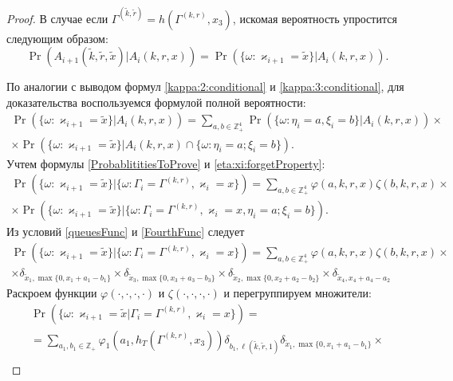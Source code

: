 \documentclass{report}
\begin{document}
\begin{proof}
В случае если $\Gamma^{(\tilde{k},\tilde{r})}=h(\Gamma^{(k,r)},x_3)$, искомая вероятность упростится следующим образом:
\begin{equation*}
\Pr (A_{i+1}(\tilde{k},\tilde{r},\tilde{x})| A_{i}({k},{r},{x})) 
=\Pr (\{\omega\colon \varkappa_{i+1}=\tilde{x}\}|A_{i}({k},{r},{x})).
\end{equation*}

По аналогии с выводом формул \eqref{kappa:2:conditional} и \eqref{kappa:3:conditional}, для доказательства воспользуемся формулой полной вероятности:
\begin{multline*}
\Pr (\{\omega\colon\varkappa_{i+1}=\tilde{x}\}|A_i(k,r,x) )= \sum_{a,b \in \mathbb{Z}_+^4} \Pr (\{\omega\colon\eta_i=a, \xi_i=b\}|A_i(k,r,x)) \times \\ 
\times
\Pr (\{\omega\colon\varkappa_{i+1}=\tilde{x}\}|A_i(k,r,x) \cap \{\omega\colon \eta_i=a; \xi_i=b\}).
\end{multline*}
Учтем формулы \eqref{ProbablititiesToProve} и \eqref{eta:xi:forgetProperty}:
\begin{multline*}
\Pr (\{\omega\colon \varkappa_{i+1}=\tilde{x}\}|\{\omega\colon\Gamma_{i}=\Gamma^{(k,r)},\varkappa_i=x\})
=\sum_{a,b \in \mathbb{Z}_+^4} \varphi(a,k,r,x) \zeta(b,k,r,x)
\times \\ \times
\Pr (\{\omega\colon\varkappa_{i+1}=\tilde{x}\}|\{\omega\colon\Gamma_{i}=\Gamma^{(k,r)},\varkappa_i=x, \eta_i=a; \xi_i=b\}).
\end{multline*}
Из условий \eqref{queuesFunc} и \eqref{FourthFunc} следует
\begin{multline*}
\Pr (\{\omega\colon\varkappa_{i+1}=\tilde{x}\}|\{\omega\colon\Gamma_{i}=\Gamma^{(k,r)},\varkappa_i=x\})=\sum_{a,b \in \mathbb{Z}_+^4} \varphi(a,k,r,x) \zeta(b,k,r,x)
\times \\ \times \delta_{\tilde{x}_1,\max{\{0,x_1+a_1-b_1\}}} \times 
 \delta_{\tilde{x}_3,\max{\{0,x_3+a_3-b_3\}}} \times
\delta_{\tilde{x}_2,\max{\{0,x_2+a_2-b_2\}}} \times
\delta_{\tilde{x}_4,x_4+a_4-a_2}
\end{multline*}
Раскроем  функции $\varphi(\cdot, \cdot, \cdot, \cdot)$ и $\zeta(\cdot, \cdot, \cdot, \cdot)$ и перегруппируем множители:
\begin{multline*}
\Pr (\{\omega\colon\varkappa_{i+1}=\tilde{x}|\Gamma_{i}=\Gamma^{(k,r)},\varkappa_i=x\})= \\
=\sum_{a_1,b_1 \in \mathbb{Z}_+} \varphi_1(a_1,h_T(\Gamma^{(k,r)},x_3)) \delta_{b_1,\ell(\tilde{k},\tilde{r},1)} \delta_{\tilde{x}_1,\max{\{0,x_1+a_1-b_1\}}} \times \\

\end{multline*}
\end{proof}
\end{document}
